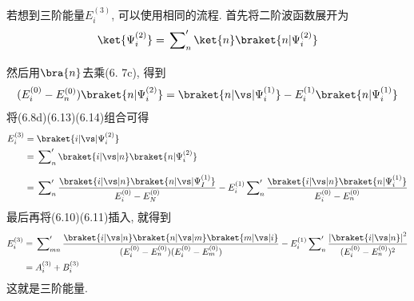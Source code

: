 若想到三阶能量$E_i^{(3)}$, 
可以使用相同的流程. 
首先将二阶波函数展开为
\begin{align}
\ket{\Psi_i^{(2)}} = \sideset{}{'}{\sum_n}\ket{n}\braket{n|\Psi_i^{(2)}}
\end{align}
然后用$\bra{n}$去乘(6.
7c), 
得到
\begin{align}
(E_i^{(0)} -E_n^{(0)} )\braket{n|\Psi_i^{(2)}} = \braket{n|\vs|\Psi_i^{(1)}} - E_i^{(1)}\braket{n|\Psi_i^{(1)}}
\end{align}
将(6.8d)(6.13)(6.14)组合可得
\begin{align*}
E_i^{(3)} & = \braket{i|\vs|\Psi_i^{(2)}}\\
		  & = \sideset{}{'}{\sum_n}\braket{i|\vs|n}\braket{n|\Psi_i^{(2)}}\\
		  & =\sideset{}{'}{\sum_n}\frac{\braket{i|\vs|n}\braket{n|\vs|\Psi_I^{(1)}}}{E_i^{(0)} - E_N^{(0)}} - E_i^{(1)} \sideset{}{'}{\sum_n}\frac{\braket{i|\vs|n}\braket{n|\Psi_i^{(1)}}}{E_i^{(0)} - E_n^{(0)} }
\end{align*}
最后再将(6.10)(6.11)插入, 
就得到
\begin{align}
E_i^{(3)} & =\sideset{}{'}{\sum_{mn}}\frac{\braket{i|\vs|n}\braket{n|\vs|m}\braket{m|\vs|i} }{(E_i^{(0)} -E_n^{(0)})(E_i^{(0)} - E_m^{(0)} )  } - E_i^{(1)} \sideset{}{'}{\sum_n} \frac{\left| \braket{i|\vs|n} \right|^2}{(E_i^{(0)} -E_n^{(0)} )^2}\notag\\
& = A_i^{(3)} + B_i^{(3)}
\label{6.15}
\end{align}
这就是三阶能量.


